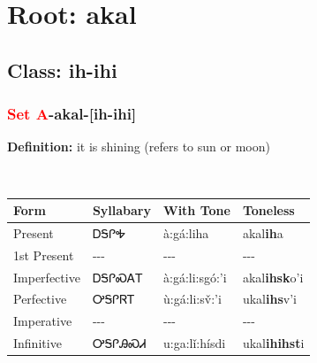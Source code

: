 \needspace{4in}
\section*{Root: akal}
\nopagebreak
{}
\needspace{3in}
\subsection*{Class: ih-ihi}
\nopagebreak
\needspace{2in}
\subsubsection*{\textcolor{Red}{Set A}{-}\textbf{akal}{-}[ih-ihi]}
\nopagebreak
\textbf{Definition: } it is shining (refers to sun or moon)
\\[0.5em]
\begin{tabularx}{\textwidth}{l X X X}%
\toprule%
\textbf{Form}&\textbf{Syllabary}&\textbf{With Tone}&\textbf{Toneless}\\%
\midrule%
Present&ᎠᎦᎵᎭ&à:gá:liha&akal\textbf{ih}a\\%
1st Present&{-}{-}{-}&{-}{-}{-}&{-}{-}{-}\\%
Imperfective&ᎠᎦᎵᏍᎪᎢ&à:gá:li:sgó:’i&akal\textbf{ihsk}o'i\\%
Perfective&ᎤᎦᎵᏒᎢ&ù:gá:li:sv̌:’i&ukal\textbf{ihs}v'i\\%
Imperative&{-}{-}{-}&{-}{-}{-}&{-}{-}{-}\\%
Infinitive&ᎤᎦᎵᎯᏍᏗ&u:ga:lǐ:hísdi&ukal\textbf{ihihst}i\\%
\bottomrule%
\end{tabularx}
\\[1em]